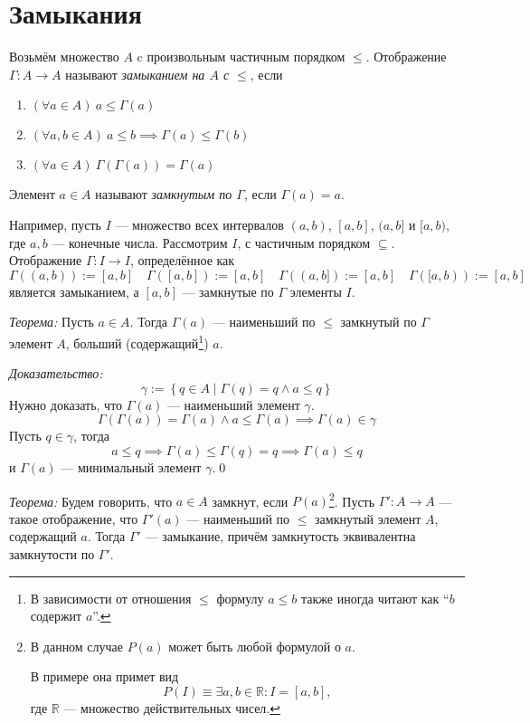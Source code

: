 \section{Замыкания}

Возьмём множество $A$ c произвольным частичным порядком $\leq$. Отображение
$\Gamma:A\to A$ называют {\it замыканием на $A$ с $\leq$}, если
\begin{enumerate}
  \item{}$(\forall a\in A)~a\leq\Gamma(a)$
  \item{}$(\forall a,b\in A)~a\leq b\implies \Gamma(a)\leq \Gamma(b)$
  \item{}$(\forall a\in A)~\Gamma(\Gamma(a))=\Gamma(a)$
\end{enumerate}
Элемент ${a\in A}$ называют {\it замкнутым по $\Gamma$},
если ${\Gamma(a)=a}$.

Например, пусть $I$ --- множество всех интервалов $(a,b)$, $[a,b]$, $(a,b]$
и $[a,b)$, где $a,b$ --- конечные числа.
Рассмотрим $I$, с частичным порядком $\subseteq$.
Отображение $\Gamma:I\to I$, определённое как
\[
  \Gamma((a,b)):=[a,b]\quad \Gamma([a,b]):=[a,b]\quad
  \Gamma((a,b]):=[a,b]\quad \Gamma([a,b)):=[a,b]
\]
является замыканием, а $[a,b]$ --- замкнутые по $\Gamma$ элементы $I$.

\vspace{1em}
{\it Теорема:} Пусть $a\in A$. Тогда $\Gamma(a)$ --- наименьший по $\leq$
замкнутый по $\Gamma$ элемент $A$,
больший (содержащий\footnote{В зависимости от отношения $\leq$ формулу
  $a\leq b$ также иногда читают как ``$b$ содержит $a$''.}) $a$.

  {\it Доказательство:}
\[
  \gamma:=\left\{q\in A\;\big|\; \Gamma(q)=q\land a\leq q\right\}
\]
Нужно доказать, что $\Gamma(a)$ --- наименьший элемент $\gamma$.
\[
  \Gamma(\Gamma(a))=\Gamma(a)\land a\leq\Gamma(a)\implies\Gamma(a)\in\gamma
\]
Пусть $q\in \gamma$, тогда
\[
  a\leq q\implies \Gamma(a)\leq\Gamma(q)=q\implies\Gamma(a)\leq q
\]
и $\Gamma(a)$ --- минимальный элемент $\gamma$.\qed

\newcommand\R{\mathbb R}
\vspace{1em}
{\it Теорема:}
Будем говорить, что ${a\in A}$ замкнут, если $P(a)$\footnote{В данном случае
$P(a)$ может быть любой формулой о $a$.

В примере она примет вид
\[
  P(I)\equiv \exists a,b\in\R:I=[a,b],
\]
где $\R$ --- множество действительных чисел.}.
Пусть ${\Gamma':A\to A}$ --- такое отображение, что $\Gamma'(a)$ --- наименьший по
$\leq$ замкнутый элемент $A$, содержащий $a$. Тогда $\Gamma'$ --- замыкание,
причём замкнутость эквивалентна замкнутости по $\Gamma'$.

